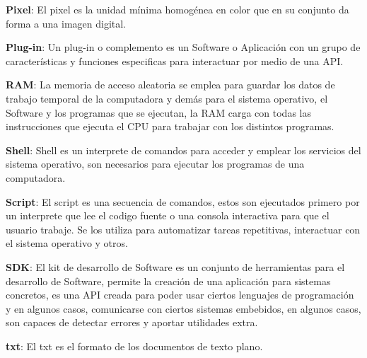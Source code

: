 \textbf{Pixel}: El pixel es la unidad mínima homogénea en color que en su conjunto da forma a una imagen digital.

\textbf{Plug-in}: Un plug-in o complemento es un Software o Aplicación con un grupo de características y funciones especificas para interactuar por medio de una API.

\textbf{RAM}: La memoria de acceso aleatoria se emplea para guardar los datos de trabajo temporal de la computadora y demás para el sistema operativo, el Software y los programas que se ejecutan, la RAM carga con todas las instrucciones que ejecuta el CPU para trabajar con los distintos programas.

\textbf{Shell}: Shell es un interprete de comandos para acceder y emplear los servicios del sistema operativo, son necesarios para ejecutar los programas de una computadora.

\textbf{Script}: El script es una secuencia de comandos, estos son ejecutados primero por un interprete que lee el codigo fuente o una consola interactiva para que el usuario trabaje. Se los utiliza para automatizar tareas repetitivas, interactuar con el sistema operativo y otros.

\textbf{SDK}: El kit de desarrollo de Software es un conjunto de herramientas para el desarrollo de Software, permite la creación de una aplicación para sistemas concretos, es una API creada para poder usar ciertos lenguajes de programación y en algunos casos, comunicarse con ciertos sistemas embebidos, en algunos casos, son capaces de detectar errores y aportar utilidades extra.

\textbf{txt}: El txt es el formato de los documentos de texto plano.





